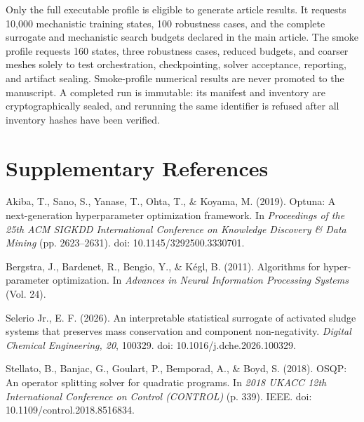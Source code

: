 \documentclass[a4paper,fleqn]{cas-sc}
\begin{document}
Only the full executable profile is eligible to generate article results. It requests 10,000 mechanistic training states, 100 robustness cases, and the complete surrogate and mechanistic search budgets declared in the main article. The smoke profile requests 160 states, three robustness cases, reduced budgets, and coarser meshes solely to test orchestration, checkpointing, solver acceptance, reporting, and artifact sealing. Smoke-profile numerical results are never promoted to the manuscript. A completed run is immutable: its manifest and inventory are cryptographically sealed, and rerunning the same identifier is refused after all inventory hashes have been verified.

\section*{Supplementary References}

\noindent Akiba, T., Sano, S., Yanase, T., Ohta, T., \& Koyama, M. (2019). Optuna: A next-generation hyperparameter optimization framework. In \textit{Proceedings of the 25th ACM SIGKDD International Conference on Knowledge Discovery \& Data Mining} (pp. 2623--2631). doi: 10.1145/3292500.3330701.

\noindent Bergstra, J., Bardenet, R., Bengio, Y., \& K\'egl, B. (2011). Algorithms for hyper-parameter optimization. In \textit{Advances in Neural Information Processing Systems} (Vol. 24).

\noindent Selerio Jr., E. F. (2026). An interpretable statistical surrogate of activated sludge systems that preserves mass conservation and component non-negativity. \textit{Digital Chemical Engineering, 20}, 100329. doi: 10.1016/j.dche.2026.100329.

\noindent Stellato, B., Banjac, G., Goulart, P., Bemporad, A., \& Boyd, S. (2018). OSQP: An operator splitting solver for quadratic programs. In \textit{2018 UKACC 12th International Conference on Control (CONTROL)} (p. 339). IEEE. doi: 10.1109/control.2018.8516834.
\end{document}
